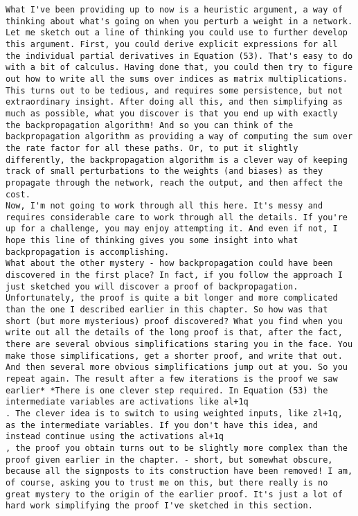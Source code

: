 \begin{lstlisting}
What I've been providing up to now is a heuristic argument, a way of thinking about what's going on when you perturb a weight in a network. Let me sketch out a line of thinking you could use to further develop this argument. First, you could derive explicit expressions for all the individual partial derivatives in Equation (53). That's easy to do with a bit of calculus. Having done that, you could then try to figure out how to write all the sums over indices as matrix multiplications. This turns out to be tedious, and requires some persistence, but not extraordinary insight. After doing all this, and then simplifying as much as possible, what you discover is that you end up with exactly the backpropagation algorithm! And so you can think of the backpropagation algorithm as providing a way of computing the sum over the rate factor for all these paths. Or, to put it slightly differently, the backpropagation algorithm is a clever way of keeping track of small perturbations to the weights (and biases) as they propagate through the network, reach the output, and then affect the cost.
Now, I'm not going to work through all this here. It's messy and requires considerable care to work through all the details. If you're up for a challenge, you may enjoy attempting it. And even if not, I hope this line of thinking gives you some insight into what backpropagation is accomplishing.
What about the other mystery - how backpropagation could have been discovered in the first place? In fact, if you follow the approach I just sketched you will discover a proof of backpropagation. Unfortunately, the proof is quite a bit longer and more complicated than the one I described earlier in this chapter. So how was that short (but more mysterious) proof discovered? What you find when you write out all the details of the long proof is that, after the fact, there are several obvious simplifications staring you in the face. You make those simplifications, get a shorter proof, and write that out. And then several more obvious simplifications jump out at you. So you repeat again. The result after a few iterations is the proof we saw earlier* *There is one clever step required. In Equation (53) the intermediate variables are activations like al+1q
. The clever idea is to switch to using weighted inputs, like zl+1q, as the intermediate variables. If you don't have this idea, and instead continue using the activations al+1q
, the proof you obtain turns out to be slightly more complex than the proof given earlier in the chapter. - short, but somewhat obscure, because all the signposts to its construction have been removed! I am, of course, asking you to trust me on this, but there really is no great mystery to the origin of the earlier proof. It's just a lot of hard work simplifying the proof I've sketched in this section.


\end{lstlisting}
